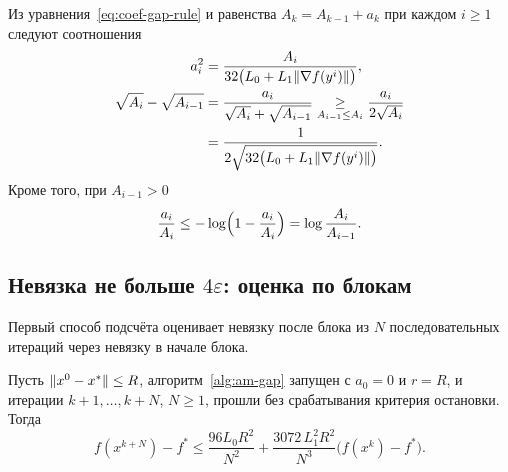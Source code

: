 Из уравнения~\eqref{eq:coef-gap-rule} и равенства $A_k=A_{k-1}+a_k$ при каждом $i\ge1$ следуют соотношения
\begin{equation}\label{eq:coef-gap}
\begin{aligned}
 a_i^2&=\frac{A_i}{32\bigl(L_0+L_1\|\nabla f(y^i)\|\bigr)},\\
 \sqrt{A_i}-\sqrt{A_{i-1}}&=\frac{a_i}{\sqrt{A_i}+\sqrt{A_{i-1}}}\mathrel{\underset{A_{i-1}\le A_i}{\ge}}\frac{a_i}{2\sqrt{A_i}}\\
 &=\frac1{2\sqrt{32\bigl(L_0+L_1\|\nabla f(y^i)\|\bigr)}} .
\end{aligned}
\end{equation}
Кроме того, при $A_{i-1}>0$
\begin{equation}\label{eq:coef-gap-log}
 \frac{a_i}{A_i}\le-\log\Bigl(1-\frac{a_i}{A_i}\Bigr)=\log\frac{A_i}{A_{i-1}} .
\end{equation}

\subsection{Невязка не больше \texorpdfstring{$4\varepsilon$}{4ε}: оценка по блокам}\label{sec:count1}

Первый способ подсчёта оценивает невязку после блока из $N$ последовательных итераций через невязку в начале блока.

\begin{lemma}\label{lem:block}
Пусть $\|x^0-x^\ast\|\le R$, алгоритм~\ref{alg:am-gap} запущен с $a_0=0$ и $r=R$, и итерации $k+1,\dots,k+N$, $N\ge1$, прошли без срабатывания критерия остановки. Тогда
\begin{equation}\label{eq:block}
 f(x^{k+N})-f^\ast\le\frac{96L_0R^2}{N^2}+\frac{3072\,L_1^2R^2}{N^3}\bigl(f(x^k)-f^\ast\bigr).
\end{equation}
\end{lemma}

